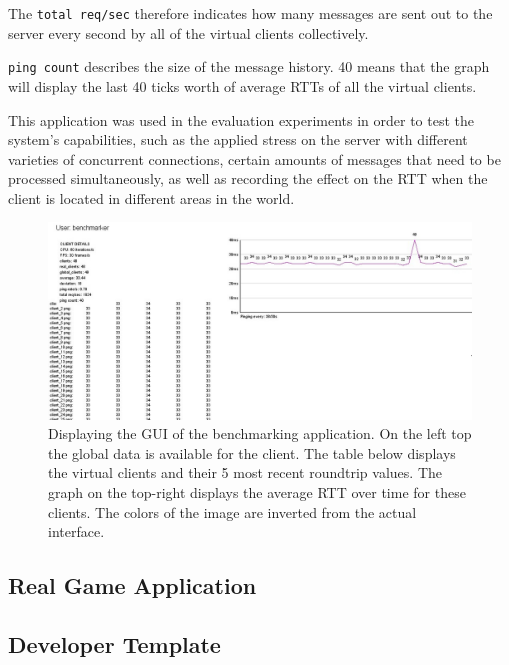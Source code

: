 \documentclass[bsc,frontabs,twoside,singlespacing,parskip,deptreport]{infthesis}     %
\begin{document}
The \texttt{total req/sec} therefore indicates how many messages are sent out to the server every second by all of the virtual clients collectively.

\texttt{ping count} describes the size of the message history. 40 means that the graph will display the last 40 ticks worth of average RTTs of all the virtual clients.

This application was used in the evaluation experiments in order to test the system's capabilities, such as the applied stress on the server with different varieties of concurrent connections, certain amounts of messages that need to be processed simultaneously, as well as recording the effect on the RTT when the client is located in different areas in the world.

\begin{figure}
\centering
\includegraphics[scale=0.55, angle=90]{images/benchmarker.jpg}
\caption{Displaying the GUI of the benchmarking application. On the left top the global data is available for the client. The table below displays the virtual clients and their 5 most recent roundtrip values. The graph on the top-right displays the average RTT over time for these clients. The colors of the image are inverted from the actual interface.}
\label{fig:benchmark_gui}
\vspace{1em}
\end{figure}

\subsection{Real Game Application}
\subsection{Developer Template}
\end{document}

